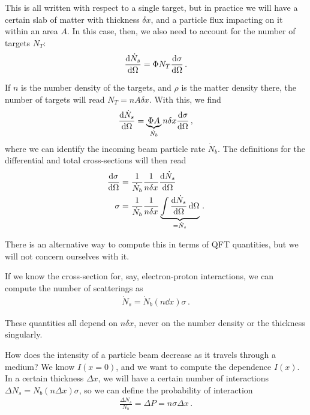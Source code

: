 \documentclass[main.tex]{subfiles}
\begin{document}
This is all written with respect to a single target, but in practice we will have a certain slab of matter with thickness \(\delta x\), and a particle flux impacting on it within an area \(A\). 
In this case, then, we also need to account for the number of targets \(N_T\): 
%
\begin{align}
\dv{\dot{N}_s}{\Omega } = \Phi N_T \dv{\sigma }{ \Omega }
\,.
\end{align}

If \(n\) is the number density of the targets, and \(\rho \) is the matter density there, the number of targets will read \(N_T = n A \delta x\). 
With this, we find 
%
\begin{align}
\dv{\dot{N}_s}{\Omega } = \underbrace{\Phi A}_{\dot{N}_b} n \delta x \dv{\sigma }{\Omega }
\,,
\end{align}
%
where we can identify the incoming beam particle rate \(\dot{N}_b\). 
The definitions for the differential and total cross-sections will then read 
%
\begin{align}
\dv{\sigma }{\Omega } &= \frac{1}{\dot{N}_b} \frac{1}{n \delta x} \dv{\dot{N}_s}{\Omega } (\theta , \varphi ) \\
\sigma &= \frac{1}{\dot{N}_b} \frac{1}{n \delta x} \underbrace{\int  \dv{\dot{N}_s}{\Omega } (\theta , \varphi ) \dd{\Omega }}_{ = \dot{N}_s}
\,.
\end{align}

There is an alternative way to compute this in terms of QFT quantities, but we will not concern ourselves with it. 

If we know the cross-section for, say, electron-proton interactions, we can compute the number of scatterings as 
%
\begin{align}
\dot{N}_s = \dot{N}_b (n \dd{x}) \sigma 
\,.
\end{align}

These quantities all depend on \(n \delta x\), never on the number density or the thickness singularly. 

How does the intensity of a particle beam decrease as it travels through a medium? We know \(I (x= 0)\), and we want to compute the dependence \(I(x)\). 
In a certain thickness \(\Delta x\), we will have a certain number of  interactions \(\Delta N_s = N_b (n \Delta x) \sigma \), so we can define the probability of interaction 
%
\begin{align}
\frac{\Delta N_s}{N_b} = \Delta P = n \sigma \Delta x
\,.
\end{align}
\end{document}

